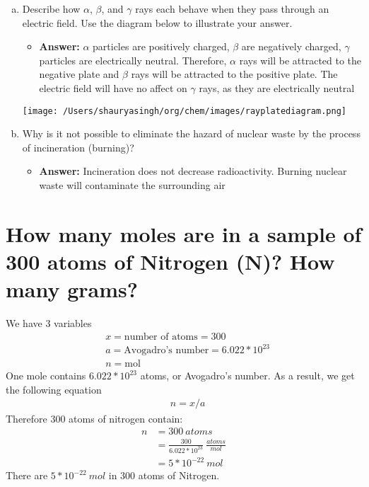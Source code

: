 \documentclass[11pt]{article}
\begin{document}
\begin{enumerate}[(a)]
\item Describe how \(\alpha\), \(\beta\), and \(\gamma\) rays each behave when they pass through an
electric field. Use the diagram below to illustrate your answer.
\begin{itemize}
\item \textbf{Answer:} \(\alpha\) particles are positively charged, \(\beta\) are negatively charged,
\(\gamma\) particles are electrically neutral. Therefore, \(\alpha\) rays will be
attracted to the negative plate and \(\beta\) rays will be attracted to
the positive plate. The electric field will have no affect on \(\gamma\)
rays, as they are electrically neutral
\end{itemize}
\begin{center}
\texttt{[image: /Users/shauryasingh/org/chem/images/rayplatediagram.png]}
\end{center}

\item Why is it not possible to eliminate the hazard of nuclear waste by the
process of incineration (burning)?
\begin{itemize}
\item \textbf{Answer:} Incineration does not decrease radioactivity. Burning nuclear
waste will contaminate the surrounding air
\end{itemize}
\end{enumerate}

\section{How many moles are in a sample of 300 atoms of Nitrogen (N)? How many grams?}
\label{sec:orgf2c8ba5}
We have 3 variables
\begin{align*}
&x=\text{number of atoms}=300\\
&a=\text{Avogadro's number}=6.022*10^{23}\\
&n=\text{mol}
\end{align*}
One mole contains \(6.022 *10^{23}\) atoms, or Avogadro's number. As a result, we
get the following equation
\begin{align*}
&n=x/a
\end{align*}
Therefore 300 atoms of nitrogen contain:
\begin{align*}
n&=300\ atoms\\
&=\frac{300}{6.022*10^{23}}\ \frac{atoms}{mol}\\
&=5*10^{-22}\ mol
\end{align*}
There are \(5*10^{-22}\ mol\) in 300 atoms of Nitrogen.
\end{document}
